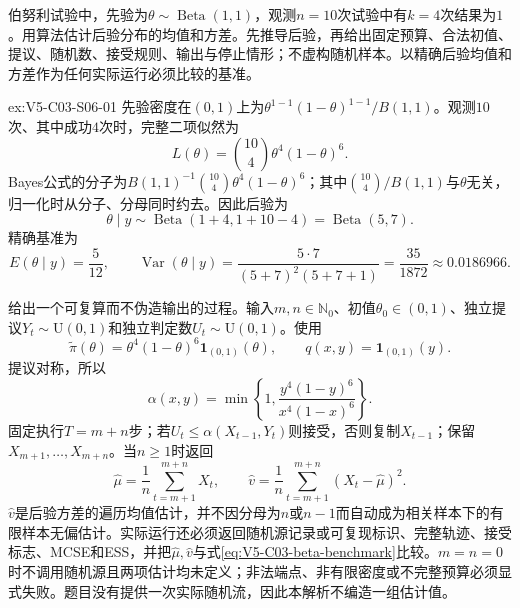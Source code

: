 \begin{SLChapterExercisePairSection}
\begin{exercise}\label{ex:V5-C03-S06-01}
伯努利试验中，先验为$\theta\sim\operatorname{Beta}(1,1)$，观测$n=10$次试验中有$k=4$次结果为$1$。用\MetropolisHastings{}算法估计后验分布的均值和方差。先推导后验，再给出固定预算、合法初值、提议、随机数、接受规则、输出与停止情形；不虚构随机样本。以精确后验均值和方差作为任何实际运行必须比较的基准。
\end{exercise}
\ifSLFullEdition
{}\label{sol:V5-C03-S06-01}
\begin{chapterexercisesolution}{ex:V5-C03-S06-01}
先验密度在$(0,1)$上为$\theta^{1-1}(1-\theta)^{1-1}/B(1,1)$。观测$10$次、其中成功$4$次时，完整二项似然为
\[
L(\theta)=\binom{10}{4}\theta^4(1-\theta)^6.
\]
Bayes公式的分子为$B(1,1)^{-1}\binom{10}{4}\theta^4(1-\theta)^6$；其中$\binom{10}{4}/B(1,1)$与$\theta$无关，归一化时从分子、分母同时约去。因此后验为
\[
\theta\mid y\sim\operatorname{Beta}(1+4,1+10-4)
=\operatorname{Beta}(5,7).
\]
精确基准为
\begin{equation}\label{eq:V5-C03-beta-benchmark}
E(\theta\mid y)=\frac5{12},
\qquad
\operatorname{Var}(\theta\mid y)
=\frac{5\cdot7}{(5+7)^2(5+7+1)}
=\frac{35}{1872}\approx0.0186966.
\end{equation}

给出一个可复算而不伪造输出的过程。输入$m,n\in\mathbb N_0$、初值$\theta_0\in(0,1)$、独立提议$Y_t\sim\mathrm U(0,1)$和独立判定数$U_t\sim\mathrm U(0,1)$。使用
\[
\widetilde\pi(\theta)=\theta^4(1-\theta)^6\boldsymbol1_{(0,1)}(\theta),
\qquad q(x,y)=\boldsymbol1_{(0,1)}(y).
\]
提议对称，所以
\[
\alpha(x,y)
=\min\left\{1,
\frac{y^4(1-y)^6}{x^4(1-x)^6}\right\}.
\]
固定执行$T=m+n$步；若$U_t\le\alpha(X_{t-1},Y_t)$则接受，否则复制$X_{t-1}$；保留$X_{m+1},\ldots,X_{m+n}$。当$n\ge1$时返回
\[
\widehat\mu=\frac1n\sum_{t=m+1}^{m+n}X_t,
\qquad
\widehat v=\frac1n\sum_{t=m+1}^{m+n}(X_t-\widehat\mu)^2.
\]
$\widehat v$是后验方差的遍历均值估计，并不因分母为$n$或$n-1$而自动成为相关样本下的有限样本无偏估计。实际运行还必须返回随机源记录或可复现标识、完整轨迹、接受标志、MCSE和ESS，并把$\widehat\mu,\widehat v$与式\eqref{eq:V5-C03-beta-benchmark}比较。$m=n=0$时不调用随机源且两项估计均未定义；非法端点、非有限密度或不完整预算必须显式失败。题目没有提供一次实际随机流，因此本解析不编造一组估计值。
\end{chapterexercisesolution}
\fi

\SLLectureSupplementExercises


\end{SLChapterExercisePairSection}
